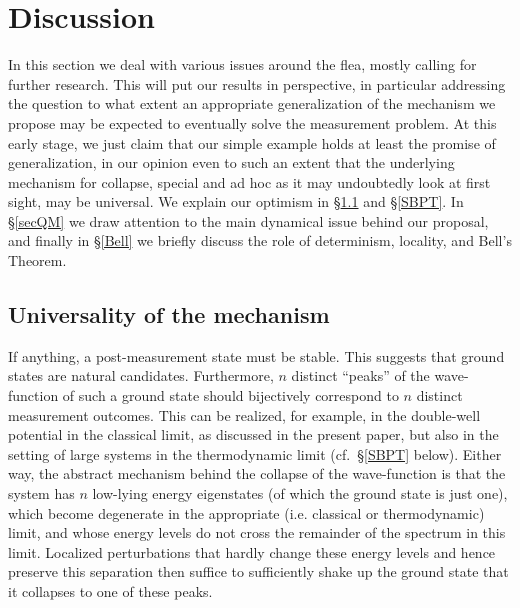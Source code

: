 \documentclass[12pt]{article}
\newcommand{\mmp}{measurement problem}
\begin{document}
\section{Discussion}
In this section we deal with various issues around the flea, mostly calling for further research. This will  put our results in perspective, in particular addressing the question to what extent an appropriate generalization of the mechanism we propose may be expected to eventually solve the \mmp. 
At this early stage, we just claim that our simple example holds at least the promise of  generalization, in our opinion even to such an extent that the underlying mechanism for collapse, special and ad hoc as it may undoubtedly look at first sight,  may be universal. 
We explain our optimism in \S\ref{univ} and \S\ref{SBPT}. In \S\ref{secQM} we draw attention to the main dynamical issue behind our proposal, and finally in 
\S\ref{Bell} we briefly discuss the role of determinism, locality, and Bell's Theorem. 
\subsection{Universality of the mechanism}\label{univ}
If anything, a post-measurement state must be stable. This suggests that ground states are natural candidates. Furthermore, $n$ distinct ``peaks'' of the wave-function of such a ground state should bijectively  correspond to $n$ distinct measurement outcomes. This can be realized, for example, in the double-well potential in the classical limit, as discussed in the present paper, but also in the setting of large systems in the thermodynamic limit (cf.\  \S\ref{SBPT} below). Either way, the abstract mechanism behind the collapse of the wave-function is that the system has $n$ low-lying energy eigenstates (of which the ground state is just one), which become degenerate in the appropriate (i.e. classical or thermodynamic) limit, and whose energy levels 
do not cross the remainder of the spectrum in this limit.
Localized perturbations that hardly change these energy levels  and hence preserve this separation then  suffice to sufficiently shake up the ground state  that it collapses to one of these peaks. 
\end{document}
